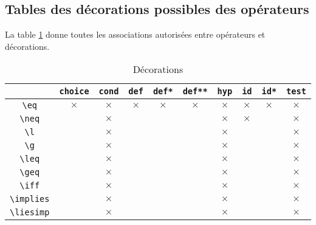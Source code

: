 \documentclass[12pt,a4paper]{article}
\begin{document}

\subsection{Tables des décorations possibles des opérateurs}

La table \ref{table:decorations-operators}  donne toutes les associations autorisées entre opérateurs et décorations.


\begin{table}[h]
    \caption{Décorations}
    \begin{center}
        \begin{tabular}{c|c|c|c|c|c|c|c|c|c}
              & \verb+choice+ & \verb+cond+ & \verb+def+ & \verb+def*+ & \verb+def**+ & \verb+hyp+ & \verb+id+ & \verb+id*+ & \verb+test+ \\
            \hline \verb+\eq+ & $\times$ & $\times$ & $\times$ & $\times$ & $\times$ & $\times$ & $\times$ & $\times$ & $\times$ \\
            \hline \verb+\neq+ &          & $\times$ &          &          &          & $\times$ & $\times$ &          & $\times$ \\
            \hline \verb+\l+ &          & $\times$ &          &          &          & $\times$ &          &          & $\times$ \\
            \hline \verb+\g+ &          & $\times$ &          &          &          & $\times$ &          &          & $\times$ \\
            \hline \verb+\leq+ &          & $\times$ &          &          &          & $\times$ &          &          & $\times$ \\
            \hline \verb+\geq+ &          & $\times$ &          &          &          & $\times$ &          &          & $\times$ \\
            \hline \verb+\iff+ &          & $\times$ &          &          &          & $\times$ &          &          & $\times$ \\
            \hline \verb+\implies+ &          & $\times$ &          &          &          & $\times$ &          &          & $\times$ \\
            \hline \verb+\liesimp+ &          & $\times$ &          &          &          & $\times$ &          &          & $\times$ \\
        \end{tabular}
    \end{center}
    \label{table:decorations-operators}
\end{table}


\end{document}
